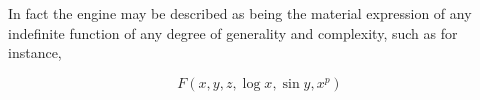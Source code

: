 \label{sec:storehouse}
In fact the engine may be described as being the material expression
of any indefinite function of any degree of generality and complexity,
such as for instance,

\begin{equation}
F(x, y, z, \log x, \sin y, x^p)
\end{equation}
